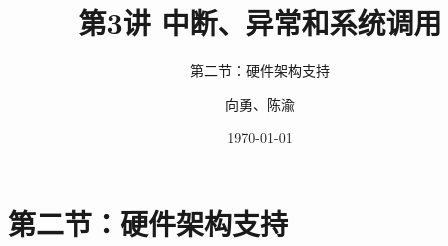 


\title[第3讲]{第3讲 中断、异常和系统调用} %
\subtitle{第二节：硬件架构支持}
\author{向勇、陈渝} %
\date{\today} %



\begin{frame}
\titlepage %
\end{frame}


\section{第二节：硬件架构支持}%

